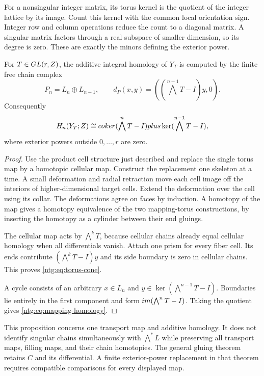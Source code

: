 For a nonsingular integer matrix, its torus kernel is the quotient
of the integer lattice by its image. Count this kernel with the common
local orientation sign. Integer row and column operations reduce the count to a
diagonal matrix. A singular matrix factors through a real subspace of
smaller dimension, so its degree is zero. These are exactly the
minors defining the exterior power.

\begin{proposition}\label{ntg:prop:mappingtorus}
For $T\in GL(r,Z)$, the additive integral homology of
$Y_T$ is computed by the finite free chain complex
\begin{equation}\label{ntg:eq:torus-cone}
 P_n=L_n\oplus L_{n-1},\qquad
 d_P(x,y)=((\bigwedge^{n-1}T-I)y,0).
\end{equation}
Consequently
\begin{equation}\label{ntg:eq:mapping-homology}
 H_n(Y_T;Z)\cong
 coker(\bigwedge^nT-I)plus
 \ker(\bigwedge^{n-1}T-I),
\end{equation}
where exterior powers outside $0,\ldots,r$ are zero.
\end{proposition}

\begin{proof}
Use the product cell structure just described and replace the single
torus map by a homotopic cellular map. Construct the replacement one skeleton at a time.
A small deformation and radial retraction move each cell image off
the interiors of higher-dimensional target cells.
Extend the deformation over the cell using its collar.
The deformations agree on faces by induction. A homotopy of the map
gives a homotopy equivalence of the two mapping-torus constructions,
by inserting the homotopy as a cylinder between their end gluings.

The cellular map acts by $\bigwedge^kT$, because cellular chains
already equal cellular homology when all differentials vanish.
Attach one prism for every fiber cell. Its ends contribute
$(\bigwedge^kT-I)y$ and its side boundary is zero in cellular
chains. This proves \eqref{ntg:eq:torus-cone}.

A cycle consists of an
arbitrary $x\in L_n$ and $y\in\ker(\bigwedge^{n-1}T-I)$.
Boundaries lie entirely in the first component and form
$im(\bigwedge^nT-I)$. Taking the quotient gives
\eqref{ntg:eq:mapping-homology}.
\end{proof}

This proposition concerns one transport map and additive homology.
It does not identify singular chains simultaneously with
$\bigwedge^*L$ while preserving all transport maps, filling maps,
and their chain homotopies. The general gluing theorem retains $C$
and its differential. A finite exterior-power replacement in that
theorem requires compatible comparisons for every displayed map.

